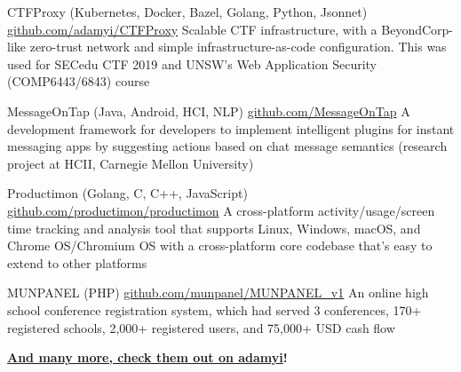 \documentclass[hidelinks__VERSION__]{adamyi-cv}
\begin{document}
\begin{entrylist}


\entry
{CTFProxy (Kubernetes, Docker, Bazel, Golang, Python, Jsonnet)}
{\href{https://github.com/adamyi/CTFProxy}{github.com/adamyi/CTFProxy}}
{Scalable CTF infrastructure, with a BeyondCorp-like zero-trust network and simple infrastructure-as-code configuration. This was used for SECedu CTF 2019 and UNSW's Web Application Security (COMP6443/6843) course}


\entry
{MessageOnTap (Java, Android, HCI, NLP)}
{\href{https://github.com/MessageOnTap}{github.com/MessageOnTap}}
{A development framework for developers to implement intelligent plugins for instant messaging apps by suggesting actions based on chat message semantics (research project at HCII, Carnegie Mellon University)}


\entry
{Productimon (Golang, C, C++, JavaScript)}
{\href{https://github.com/productimon/productimon}{github.com/productimon/productimon}}
{A cross-platform activity/usage/screen time tracking and analysis tool that supports Linux, Windows, macOS, and Chrome OS/Chromium OS with a cross-platform core codebase that's easy to extend to other platforms}


\entry
{MUNPANEL (PHP)}
{\href{https://github.com/munpanel/MUNPANEL_v1}{github.com/munpanel/MUNPANEL\_v1}}
{An online high school conference registration system, which had served 3 conferences, 170+ registered schools, 2,000+ registered users, and 75,000+ USD cash flow}


\item[\textbf{\href{https://github.com/adamyi}{And many more, check them out on \faGithub \hspace{0.1em} adamyi}!}]

\end{entrylist}

\pagebreak

\end{document}
